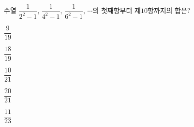 \hspace*{2mm}\begin{minipage}[t]{\dimexpr\linewidth-2mm\relax}\vspace{0pt}
수열 $\dfrac{1}{2^2-1}$, $\dfrac{1}{4^2-1}$, $\dfrac{1}{6^2-1}$, $\cdots$의 첫째항부터 제$10$항까지의 합은?
\begin{choices32}{\rule[-3ex]{0pt}{8ex}$\dfrac{9}{19}$}{\rule[-3ex]{0pt}{8ex}$\dfrac{18}{19}$}{\rule[-3ex]{0pt}{8ex}$\dfrac{10}{21}$}{\rule[-3ex]{0pt}{8ex}$\dfrac{20}{21}$}{\rule[-3ex]{0pt}{8ex}$\dfrac{11}{23}$}\end{choices32}\end{minipage}
